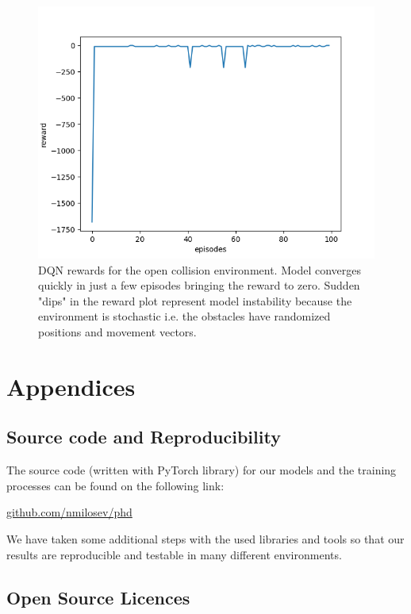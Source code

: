 \documentclass[b5paper]{book}
\begin{document}
\begin{figure}[!ht]
  \centering
  \includegraphics[scale=0.8]{figures/dqn_results.png} 
  \caption{DQN rewards for the open collision environment. Model converges quickly in just a few episodes bringing the reward to zero. Sudden "dips" in the reward plot represent model instability because the environment is stochastic i.e. the obstacles have randomized positions and movement vectors.}
  \label{fig:bird}
\end{figure}

\part{Appendices}
\chapter{Source code and Reproducibility}
\label{source}

The source code (written with PyTorch library) for our models and the training processes can be found on the following link: 

\begin{footnotesize}
\url{github.com/nmilosev/phd}
\end{footnotesize}

We have taken some additional steps with the used libraries and tools so that our results are reproducible and testable in many different environments.

\chapter{Open Source Licences}
\backmatter
\end{document}
